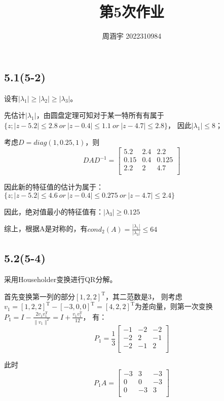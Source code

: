 \documentclass[UTF8,zihao=5]{ctexart}
\title{{\bfseries 第5次作业}}
\author{周涵宇 2022310984}
\date{}
\newcommand{\trans}[0]{^\mathrm{T}}
\begin{document}
\maketitle

\subsection*{5.1(5-2)}

设有$|\lambda_1| \geq |\lambda_2| \geq |\lambda_3|$。

先估计$|\lambda_1|$，由圆盘定理可知对于某一特所有有属于
$\{z;|z-5.2|\leq 2.8\ or\ |z-0.4|\leq 1.1\ or\ |z-4.7|\leq 2.8\}$，
因此$|\lambda_1|\leq 8$；

考虑$D=diag(1,0.25,1)$，则
$$
    DAD^{-1}=\begin{bmatrix}
        5.2  & 2.4 & 2.2   \\
        0.15 & 0.4 & 0.125 \\
        2.2  & 2   & 4.7   \\
    \end{bmatrix}
$$

因此新的特征值的估计为属于：
$\{z;|z-5.2|\leq 4.6\ or\ |z-0.4|\leq 0.275\ or\ |z-4.7|\leq 2.4\}$

因此，绝对值最小的特征值有：$|\lambda_3|\geq0.125$

综上，根据A是对称的，有$cond_2(A)=\frac{|\lambda_1|}{|\lambda_3|}\leq64$

\subsection*{5.2(5-4)}

采用Householder变换进行QR分解。

首先变换第一列的部分$[1,2,2]\trans$，其二范数是$3$，
则考虑$v_1=[1,2,2]\trans-[-3,0,0]\trans=[4,2,2]\trans$为差向量，则第一次变换
$P_1=I-\frac{2v_1v_1\trans}{\|v_1\|^2}=I+\frac{v_1v_1\trans}{12}$，
有：
$$
    P_1=\frac{1}{3}\begin{bmatrix}
        -1 & -2 & -2 \\
        -2 & 2  & -1 \\
        -2 & -1 & 2  \\
    \end{bmatrix}
$$

此时
$$
    P_1A=\begin{bmatrix}
        -3 & 3  & -3 \\
        0  & 0  & -3 \\
        0  & -3 & 3  \\
    \end{bmatrix}
$$
\end{document}

